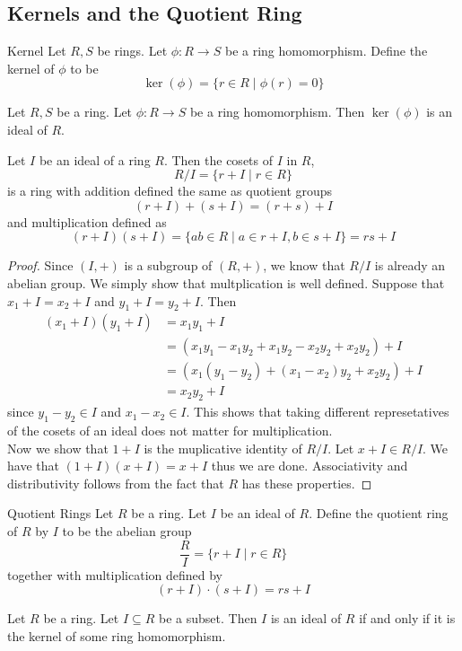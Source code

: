 \documentclass[a4paper]{article}
\begin{document}
\subsection{Kernels and the Quotient Ring}
\begin{defn}{Kernel}{} Let $R,S$ be rings. Let $\phi:R\to S$ be a ring homomorphism. Define the kernel of $\phi$ to be $$\ker(\phi)=\{r\in R\;|\;\phi(r)=0\}$$
\end{defn}

\begin{prp}{}{} Let $R,S$ be a ring. Let $\phi:R\to S$ be a ring homomorphism. Then $\ker(\phi)$ is an ideal of $R$. 
\end{prp}

\begin{prp}{}{} Let $I$ be an ideal of a ring $R$. Then the cosets of $I$ in $R$, $$R/I=\{r+I\;|\;r\in R\}$$ is a ring with addition defined the same as quotient groups $$(r+I)+(s+I)=(r+s)+I$$ and multiplication defined as $$(r+I)(s+I)=\{ab\in R\;|\;a\in r+I,b\in s+I\}=rs+I$$ 
\begin{proof}
Since $(I,+)$ is a subgroup of $(R,+)$, we know that $R/I$ is already an abelian group. We simply show that multplication is well defined. Suppose that $x_1+I=x_2+I$ and $y_1+I=y_2+I$. Then 
\begin{align*}
(x_1+I)(y_1+I)&=x_1y_1+I\\
&=(x_1y_1-x_1y_2+x_1y_2-x_2y_2+x_2y_2)+I\\
&=(x_1(y_1-y_2)+(x_1-x_2)y_2+x_2y_2)+I\\
&=x_2y_2+I
\end{align*}
since $y_1-y_2\in I$ and $x_1-x_2\in I$. This shows that taking different represetatives of the cosets of an ideal does not matter for multiplication. \\
Now we show that $1+I$ is the muplicative identity of $R/I$. Let $x+I\in R/I$. We have that $(1+I)(x+I)=x+I$ thus we are done. Associativity and distributivity follows from the fact that $R$ has these properties. 
\end{proof}
\end{prp}

\begin{defn}{Quotient Rings}{} Let $R$ be a ring. Let $I$ be an ideal of $R$. Define the quotient ring of $R$ by $I$ to be the abelian group $$\frac{R}{I}=\{r+I\;|\;r\in R\}$$ together with multiplication defined by $$(r+I)\cdot(s+I)=rs+I$$
\end{defn}

\begin{prp}{}{} Let $R$ be a ring. Let $I\subseteq R$ be a subset. Then $I$ is an ideal of $R$ if and only if it is the kernel of some ring homomorphism. 
\end{prp}
\end{document}
